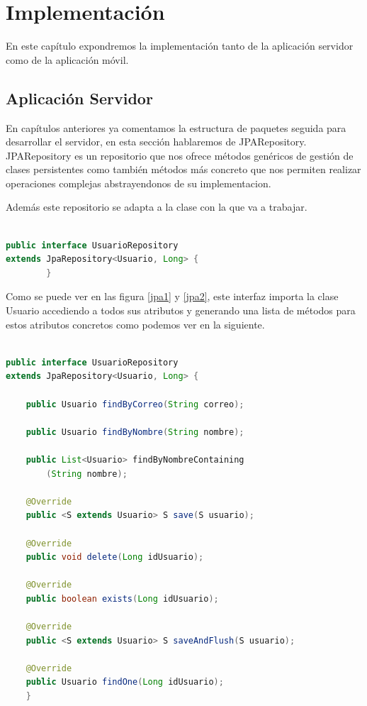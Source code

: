 
\section{Implementación}
En este capítulo expondremos la implementación tanto de la aplicación servidor como de la aplicación móvil.



\subsection{ Aplicación Servidor}
En capítulos anteriores ya comentamos la estructura de paquetes seguida para desarrollar el servidor, en esta sección hablaremos de JPARepository.\\

JPARepository es un repositorio que nos ofrece métodos genéricos de gestión de clases persistentes como también métodos más concreto que nos permiten realizar operaciones complejas abstrayendonos de su implementacion.

Además este repositorio se adapta a la clase con la que va a trabajar.
\begin{lstlisting}[language=java,caption={Adaptación a la clase Usuario },label=jpa1]
    
public interface UsuarioRepository 
extends JpaRepository<Usuario, Long> {
		}

\end{lstlisting} 
	



	
Como se puede ver en las figura \ref{jpa1} y \ref{jpa2}, este interfaz importa la clase Usuario accediendo a todos sus atributos y generando una lista de métodos para estos atributos concretos como podemos ver en la siguiente.\\

\begin{lstlisting}[language=java,caption={Interfaz  de UsuarioRepository},label=jpa2]
    
public interface UsuarioRepository 
extends JpaRepository<Usuario, Long> {

	public Usuario findByCorreo(String correo);

	public Usuario findByNombre(String nombre);

	public List<Usuario> findByNombreContaining
		(String nombre);

	@Override
	public <S extends Usuario> S save(S usuario);

	@Override
	public void delete(Long idUsuario);

	@Override
	public boolean exists(Long idUsuario);

	@Override
	public <S extends Usuario> S saveAndFlush(S usuario);

	@Override
	public Usuario findOne(Long idUsuario);
	}


\end{lstlisting} 









